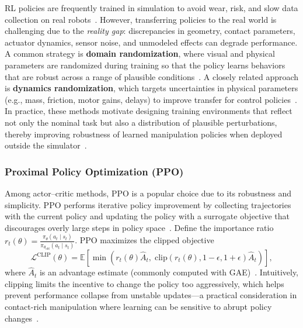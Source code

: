 \ac{RL} policies are frequently trained in simulation to avoid wear, risk, and slow data collection on real robots~\cite{Kober2013Survey}.
However, transferring policies to the real world is challenging due to the \emph{reality gap}: discrepancies in geometry,
contact parameters, actuator dynamics, sensor noise, and unmodeled effects can degrade performance.
A common strategy is \textbf{domain randomization}, where visual and physical parameters are randomized during training so that
the policy learns behaviors that are robust across a range of plausible conditions~\cite{Tobin2017DomainRand}.
A closely related approach is \textbf{dynamics randomization}, which targets uncertainties in physical parameters (e.g., mass,
friction, motor gains, delays) to improve transfer for control policies~\cite{Peng2018DynamicsRand}.
In practice, these methods motivate designing training environments that reflect not only the nominal task but also a
distribution of plausible perturbations, thereby improving robustness of learned manipulation policies when deployed outside
the simulator~\cite{Kober2013Survey,Tobin2017DomainRand,Peng2018DynamicsRand}.

\subsubsection{Proximal Policy Optimization (PPO)}
\label{sec:ppo}

Among actor--critic methods, \ac{PPO} is a popular choice due to its robustness and simplicity.
\ac{PPO} performs iterative policy improvement by collecting trajectories with the current policy and updating the policy with a
surrogate objective that discourages overly large steps in policy space~\cite{Schulman2017PPO}.
Define the importance ratio
$r_t(\theta)=\frac{\pi_\theta(a_t\mid s_t)}{\pi_{\theta_{\text{old}}}(a_t\mid s_t)}$.
\ac{PPO} maximizes the clipped objective
\begin{equation}
  \mathcal{L}^{\text{CLIP}}(\theta)=
  \mathbb{E}\left[
    \min\left(
      r_t(\theta)\hat{A}_t,\;
      \text{clip}(r_t(\theta),1-\epsilon,1+\epsilon)\hat{A}_t
    \right)
  \right],
\end{equation}
where $\hat{A}_t$ is an advantage estimate (commonly computed with \ac{GAE})~\cite{Schulman2015GAE,Schulman2017PPO}.
Intuitively, clipping limits the incentive to change the policy too aggressively, which helps prevent performance collapse
from unstable updates---a practical consideration in contact-rich manipulation where learning can be sensitive to abrupt
policy changes~\cite{Schulman2017PPO,Kober2013Survey}.

